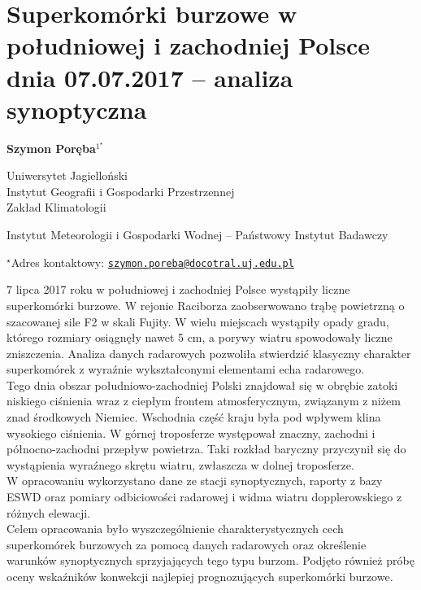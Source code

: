 \documentclass[\main/boa.tex]{subfiles}
\begin{document}
\section{Superkomórki burzowe w południowej i zachodniej Polsce dnia 07.07.2017 – analiza synoptyczna}

\begin{center}
  {\bf {} Szymon Poręba$^{1^\star}$}
\end{center}

\vskip 0.3cm

\begin{affiliations}
\begin{enumerate}
\begin{minipage}{0.915\textwidth}
\centering
\item Uniwersytet Jagielloński\\ Instytut Geografii i Gospodarki Przestrzennej\\ Zakład Klimatologii
\\[-2pt]
\item Instytut Meteorologii i Gospodarki Wodnej -- Państwowy Instytut Badawczy \\[-2pt]
\end{minipage}
\end{enumerate}
$^\star$Adres kontaktowy: \href{mailto:szymon.poreba@docotral.uj.edu.pl}{\nolinkurl{szymon.poreba@docotral.uj.edu.pl}}\\
\end{affiliations}

\vskip 0.5cm


\vskip 0.5cm

7 lipca 2017 roku w południowej i zachodniej Polsce wystąpiły liczne superkomórki burzowe. W rejonie Raciborza zaobserwowano trąbę powietrzną o szacowanej sile F2 w skali Fujity.  W wielu miejscach wystąpiły opady gradu, którego rozmiary osiągnęły nawet 5 cm, a porywy wiatru spowodowały liczne zniszczenia. Analiza danych radarowych pozwoliła stwierdzić klasyczny charakter superkomórek z wyraźnie wykształconymi elementami echa radarowego. \\
Tego dnia obszar południowo-zachodniej Polski znajdował się w obrębie zatoki niskiego ciśnienia wraz z ciepłym frontem atmosferycznym, związanym z niżem znad środkowych Niemiec. Wschodnia część kraju była pod wpływem  klina wysokiego ciśnienia. W górnej troposferze występował znaczny, zachodni i północno-zachodni przepływ powietrza. Taki rozkład baryczny przyczynił się do wystąpienia wyraźnego skrętu wiatru, zwłaszcza w dolnej troposferze. \\
W opracowaniu wykorzystano dane ze stacji synoptycznych, raporty z bazy ESWD oraz pomiary odbiciowości radarowej i widma wiatru dopplerowskiego z różnych elewacji.\\
Celem opracowania było wyszczególnienie charakterystycznych cech superkomórek burzowych za pomocą danych radarowych oraz określenie warunków synoptycznych sprzyjających tego typu burzom. Podjęto również próbę oceny wskaźników konwekcji najlepiej prognozujących superkomórki burzowe.
\end{document}
